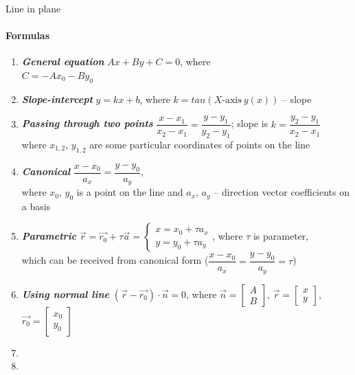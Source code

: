 \documentclass[aspectratio=169]{beamer}
\begin{document}
\begin{frame}[t]{Line in plane}
\framesubtitle{Formulas}
\scriptsize
\vspace{-0.4cm}
\begin{multicols}{2}
    \begin{enumerate}
        \item \textbf{\textit{General equation}} $Ax + By + C = 0$, where \\ $C = -Ax_0 - By_0$
        \item \textbf{\textit{Slope-intercept}} $y = kx + b$, where $k = tan(X\text{-axis} \hat{\ }y(x))$ -- slope
         \item \textbf{\textit{Passing through two points}} $\dfrac{x-x_1}{x_2-x_1} = \dfrac{y-y_1}{y_2-y_1}$; slope is $k = \dfrac{y_2-y_1}{x_2-x_1}$\\ where $x_{1,2}$, $y_{1,2}$ are some particular coordinates of points on the line
        \item \textbf{\textit{Canonical}} $\dfrac{x-x_0}{a_x} = \dfrac{y-y_0}{a_y}$,\\ where $x_0$, $y_0$ is a point on the line and $a_x$, $a_y$ -- direction vector coefficients on a basis
        \item \textbf{\textit{Parametric}} $\vec{r} = \vec{r_0} + \tau \vec{a}=\left\{\begin{matrix} x = x_0 + \tau a_x 
    \\ y = y_0 + \tau a_y 
    \end{matrix}\right.$, where $\tau$ is parameter,\\ which can be received from canonical form ($\dfrac{x-x_0}{a_x} = \dfrac{y-y_0}{a_y} = \tau$)
        \item \textbf{\textit{Using normal line}} $(\vec{r} - \vec{r_0}) \cdot \vec{n} = 0$, where $\vec{n} = \begin{bmatrix}A\\B \end{bmatrix}$, $\vec{r} = \begin{bmatrix}x\\y \end{bmatrix}$, $\vec{r_0} = \begin{bmatrix}x_0\\y_0 \end{bmatrix}$
        \item[\vspace{\fill}]
        \item[\vspace{\fill}]
    \end{enumerate}
\end{multicols}
\end{frame}
\end{document}
